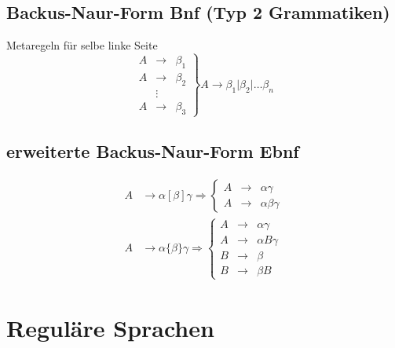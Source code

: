 \documentclass{scrartcl}
\begin{document}
\subsection*{Backus-Naur-Form Bnf (Typ 2 Grammatiken)}
Metaregeln für selbe linke Seite
\[
\left. \begin{array}{ccc}
A & \to    & \beta_1 \\ 
A & \to    & \beta_2 \\ 
  & \vdots &         \\ 
A & \to    & \beta_3
\end{array} \right\rbrace A\to\beta_1\vert\beta_2\vert\ldots\beta_n
\]

\subsection*{erweiterte Backus-Naur-Form Ebnf}
\begin{align*}
A &\to \alpha[\beta]\gamma \Rightarrow \left\lbrace
\begin{array}{ccc}
A & \to & \alpha\gamma \\
A & \to & \alpha\beta\gamma
\end{array}
\right. \\
A &\to \alpha\{\beta\}\gamma \Rightarrow \left\lbrace
\begin{array}{ccc}
A & \to & \alpha\gamma \\
A & \to & \alpha B\gamma \\
B & \to & \beta \\
B & \to & \beta B
\end{array}
\right.
\end{align*}

\section*{Reguläre Sprachen}
\end{document}

